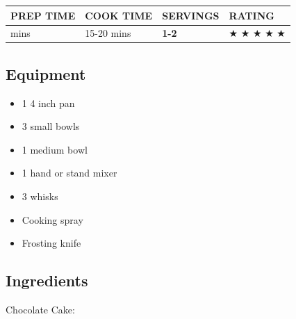 \documentclass[
]{book}
\providecommand{\tightlist}{%
  \setlength{\itemsep}{0pt}\setlength{\parskip}{0pt}}
\begin{document}
\begin{longtable}[]{@{}llll@{}}
\toprule\noalign{}
\textbf{PREP TIME} & \textbf{COOK TIME} & \textbf{SERVINGS} &
\textbf{RATING} \\
\midrule\noalign{}
\endhead
\bottomrule\noalign{}
\endlastfoot
15 mins & 15-20 mins & \textbf{1-2} & ★ ★ ★ ★ ★ \\
\end{longtable}

\subsection*{Equipment}\label{equipment-7}

\begin{itemize}
\tightlist
\item
  1 4 inch pan
\item
  3 small bowls
\item
  1 medium bowl
\item
  1 hand or stand mixer
\item
  3 whisks
\item
  Cooking spray
\item
  Frosting knife
\end{itemize}

\subsection*{Ingredients}\label{ingredients-7}

Chocolate Cake:
\end{document}
